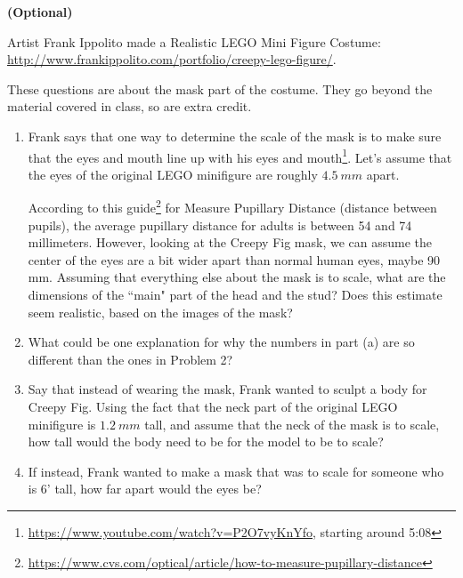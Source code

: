 \documentclass[handout,nooutcomes,noauthor,hints]{../ximera}
\begin{document}
\mynewpage
\begin{question}\textbf{(Optional)}

Artist Frank Ippolito made a Realistic LEGO Mini Figure Costume: \url{http://www.frankippolito.com/portfolio/creepy-lego-figure/}.  


These questions are about the mask part of the costume.  They go beyond the material covered in class, so are extra credit.
 
\begin{enumerate}
 \item Frank says that one way to determine the scale of the mask is to make sure that the eyes and mouth line up with his eyes and mouth\footnote{\url{https://www.youtube.com/watch?v=P2O7vyKnYfo}, starting around 5:08}. Let's assume that the eyes of the original LEGO minifigure are roughly $4.5 \ mm$ apart. 
 
According to this guide\footnote{\url{https://www.cvs.com/optical/article/how-to-measure-pupillary-distance}} for Measure Pupillary Distance (distance between pupils), the average pupillary distance for adults is between 54 and 74 millimeters. However, looking at the Creepy Fig mask, we can assume the center of the eyes are a bit wider apart than normal human eyes, maybe 90 mm. Assuming that everything else about the mask is to scale, what are the dimensions of the ``main" part of the head and the stud? Does this estimate seem realistic, based on the images of the mask?

\item What could be one explanation for why the numbers in part (a) are so different than the ones in Problem 2?

\item Say that instead of wearing the mask, Frank wanted to sculpt a body for Creepy Fig. Using the fact that the neck part of the original LEGO minifigure is $1.2\ mm$ tall, and assume that the neck of the mask is to scale, how tall would the body need to be for the model to be to scale?

\item If instead, Frank wanted to make a mask that was to scale for someone who is 6' tall, how far apart would the eyes be?
 \end{enumerate}
 
\end{question}
\end{document}
